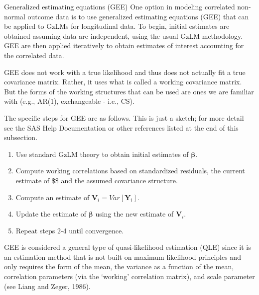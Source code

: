 \documentclass[
  9pt,
  ignorenonframetext,
]{beamer}
\providecommand{\tightlist}{%
  \setlength{\itemsep}{0pt}\setlength{\parskip}{0pt}}
\begin{document}
\begin{frame}{Generalized estimating equations (GEE)}
\protect\hypertarget{generalized-estimating-equations-gee}{}
One option in modeling correlated non-normal outcome data is to use
generalized estimating equations (GEE) that can be applied to GzLMs for
longitudinal data. To begin, initial estimates are obtained assuming
data are independent, using the usual GzLM methodology. GEE are then
applied iteratively to obtain estimates of interest accounting for the
correlated data.

GEE does not work with a true likelihood and thus does not actually fit
a true covariance matrix. Rather, it uses what is called a working
covariance matrix. But the forms of the working structures that can be
used are ones we are familiar with (e.g., AR(1), exchangeable - i.e.,
CS).
\end{frame}

\begin{frame}{}
\protect\hypertarget{section-4}{}
The specific steps for GEE are as follows. This is just a sketch; for
more detail see the SAS Help Documentation or other references listed at
the end of this subsection.

\begin{enumerate}
\tightlist
\item
  Use standard GzLM theory to obtain initial estimates of
  \(\pmb \beta\).
\item
  Compute working correlations based on standardized residuals, the
  current estimate of \$\pmb \beta \$ and the assumed covariance
  structure.
\item
  Compute an estimate of \(\pmb V_i = Var[\pmb Y_i]\).
\item
  Update the estimate of \(\pmb \beta\) using the new estimate of
  \(\pmb V_i\).
\item
  Repeat steps 2-4 until convergence.
\end{enumerate}

GEE is considered a general type of quasi-likelihood estimation (QLE)
since it is an estimation method that is not built on maximum likelihood
principles and only requires the form of the mean, the variance as a
function of the mean, correlation parameters (via the `working'
correlation matrix), and scale parameter (see Liang and Zeger, 1986).
\end{frame}
\end{document}
